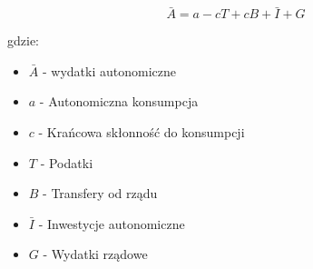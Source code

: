 \begin{equation}
    \bar{A} = a - c T + c B + \bar{I} + G
    \end{equation}

    gdzie:
    \begin{itemize}
        \item \(\bar{A}\) - wydatki autonomiczne
        \item \(a\) - Autonomiczna konsumpcja
        \item \(c\) - Krańcowa skłonność do konsumpcji
        \item \(T\) - Podatki
        \item \(B\) - Transfery od rządu
        \item \(\bar{I}\) - Inwestycje autonomiczne
        \item \(G\) - Wydatki rządowe
    \end{itemize}
